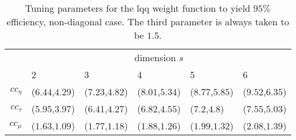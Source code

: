\begin{table}[htbp!]
\begin{center}
{\small
\begin{tabular}{rlllll}
  \hline
  & \multicolumn{5}{c}{dimension $s$} \\
  \cline{2-6}
   & 2 & 3 & 4 & 5 & 6 \\
   \hline
$cc_\eta$ & ($6.44$,$4.29$) & ($7.23$,$4.82$) & ($8.01$,$5.34$) & ($8.77$,$5.85$) & ($9.52$,$6.35$) \\
  $cc_\tau$ & ($5.95$,$3.97$) & ($6.41$,$4.27$) & ($6.82$,$4.55$) & ($7.2$,$4.8$) & ($7.55$,$5.03$) \\
  $cc_\mu$ & ($1.63$,$1.09$) & ($1.77$,$1.18$) & ($1.88$,$1.26$) & ($1.99$,$1.32$) & ($2.08$,$1.39$) \\
   \hline
\end{tabular}
}
\caption{Tuning parameters for the lqq weight function to yield $95\%$
  efficiency, non-diagonal case. The third parameter is always taken to be $1.5$.}
\label{tab:effLqq}
\end{center}
\end{table}
